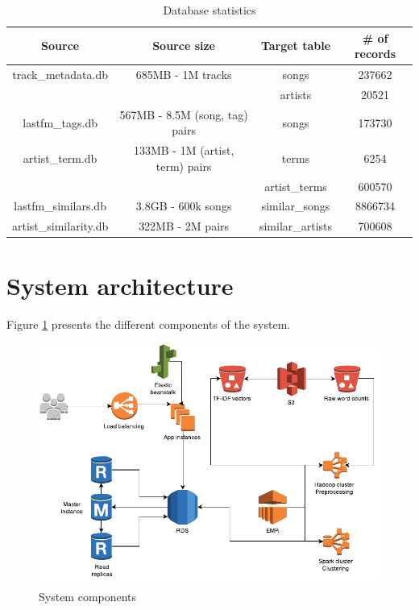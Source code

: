 \documentclass[10pt,a4paper, twocolumn]{article}
\begin{document}
	  \begin{table}
	    \centering
	    \caption{Database statistics}
	    \begin{tabular}{|c||c||c||c|}
	    \hline
	    Source & Source size & Target table & \# of records \\
	    \hline
	    track\_metadata.db & 685MB - 1M tracks & songs &
	    237662 \\
	    & & artists & 20521 \\
	    \hline
	    lastfm\_tags.db & 567MB - 8.5M (song, tag) pairs & songs &
	    173730\\
	    \hline
	    artist\_term.db & 133MB - 1M (artist, term) pairs & terms & 6254\\
	    & & artist\_terms & 600570\\
	    \hline
	    lastfm\_similars.db & 3.8GB - 600k songs
	    & similar\_songs & 8866734 \\
	    \hline
	    artist\_similarity.db & 322MB - 2M pairs & similar\_artists & 700608\\
	    \hline
	    \end{tabular}
	    \label{tab:database_stats}
	  \end{table}     
  
  \section{System architecture}
  
  Figure \ref{fig:architecture} presents the different components of the system.
  
  \begin{figure}
    \centering
    \includegraphics[width=\columnwidth]{img/architecture}
    \caption{System components}
    \label{fig:architecture}
  \end{figure}          
      
\end{document}
